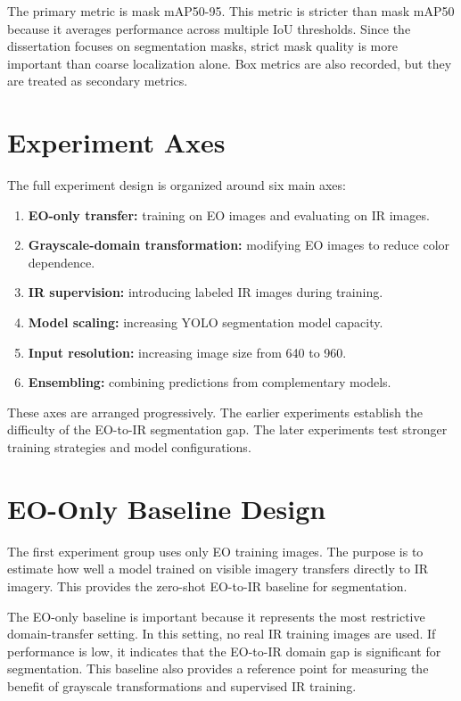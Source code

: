The primary metric is mask mAP50-95. This metric is stricter than mask mAP50 because it averages performance across multiple IoU thresholds. Since the dissertation focuses on segmentation masks, strict mask quality is more important than coarse localization alone. Box metrics are also recorded, but they are treated as secondary metrics.

\section{Experiment Axes}

The full experiment design is organized around six main axes:

\begin{enumerate}
    \item \textbf{EO-only transfer:} training on EO images and evaluating on IR images.
    \item \textbf{Grayscale-domain transformation:} modifying EO images to reduce color dependence.
    \item \textbf{IR supervision:} introducing labeled IR images during training.
    \item \textbf{Model scaling:} increasing YOLO segmentation model capacity.
    \item \textbf{Input resolution:} increasing image size from 640 to 960.
    \item \textbf{Ensembling:} combining predictions from complementary models.
\end{enumerate}

These axes are arranged progressively. The earlier experiments establish the difficulty of the EO-to-IR segmentation gap. The later experiments test stronger training strategies and model configurations.

\section{EO-Only Baseline Design}

The first experiment group uses only EO training images. The purpose is to estimate how well a model trained on visible imagery transfers directly to IR imagery. This provides the zero-shot EO-to-IR baseline for segmentation.

The EO-only baseline is important because it represents the most restrictive domain-transfer setting. In this setting, no real IR training images are used. If performance is low, it indicates that the EO-to-IR domain gap is significant for segmentation. This baseline also provides a reference point for measuring the benefit of grayscale transformations and supervised IR training.

